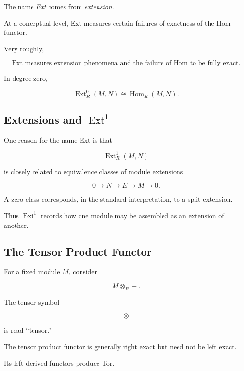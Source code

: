 The name \emph{Ext} comes from \emph{extension}.

At a conceptual level, Ext measures certain failures of exactness of the
Hom functor.

\begin{conceptbox}
Very roughly,

\[ \boxed{\operatorname{Ext}\text{ measures extension phenomena and the
failure of Hom to be fully exact.}} \]
\end{conceptbox}

In degree zero,

\[ \operatorname{Ext}_R^0(M,N)\cong\operatorname{Hom}_R(M,N). \]

\subsection{Extensions and \(\operatorname{Ext}^1\)}
\label{subsec:ext1-extensions}

One reason for the name Ext is that

\[ \operatorname{Ext}_R^1(M,N) \]

is closely related to equivalence classes of module extensions

\[ 0\to N\to E\to M\to0. \]

A zero class corresponds, in the standard interpretation, to a split
extension.

Thus \(\operatorname{Ext}^1\) records how one module may be assembled as an
extension of another.

\subsection{The Tensor Product Functor}
\label{subsec:tensor-functor-homological}

For a fixed module \(M\), consider

\[ M\otimes_R -. \]

The tensor symbol

\[ \otimes \]

is read ``tensor.''

The tensor product functor is generally right exact but need not be left
exact.

Its left derived functors produce Tor.

